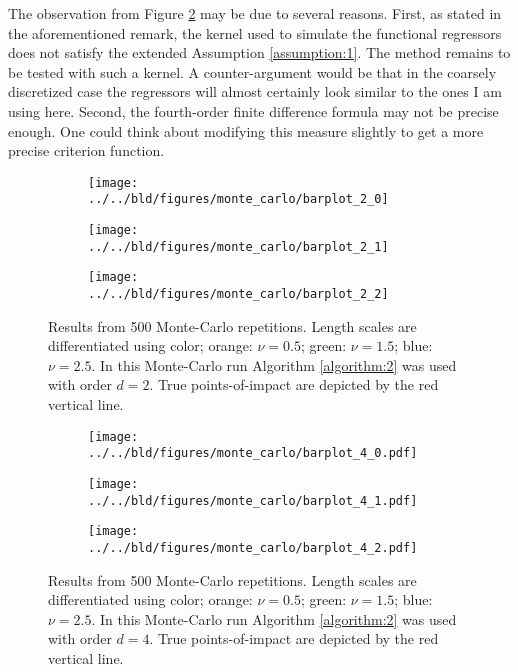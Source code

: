 The observation from Figure \ref{figure:monte_carlo_results_order4} may be due to
several reasons. First, as stated in the aforementioned remark, the kernel used to
simulate the functional regressors does not satisfy the extended Assumption
\ref{assumption:1}. The method remains to be tested with such a kernel. A
counter-argument would be that in the coarsely discretized case the regressors will
almost certainly look similar to the ones I am using here. Second, the fourth-order
finite difference formula may not be precise enough. One could think about modifying
this measure slightly to get a more precise criterion function.

\begin{figure}

\begin{subfigure}[b]{\textwidth}
\centering
\texttt{[image: ../../bld/figures/monte\_carlo/barplot\_2\_0]}
\end{subfigure}

\begin{subfigure}[b]{\textwidth}
\centering
\texttt{[image: ../../bld/figures/monte\_carlo/barplot\_2\_1]}
\end{subfigure}

\begin{subfigure}[b]{\textwidth}
\centering
\texttt{[image: ../../bld/figures/monte\_carlo/barplot\_2\_2]}
\end{subfigure}

\caption{Results from 500 Monte-Carlo repetitions. Length scales are differentiated
using color; orange: $\nu = 0.5$; green: $\nu = 1.5$; blue: $\nu = 2.5$. In this
Monte-Carlo run Algorithm \ref{algorithm:2} was used with order $d = 2$. True
points-of-impact are depicted by the red vertical line.}
\label{figure:monte_carlo_results_order2}
\end{figure}

\begin{figure}

\begin{subfigure}[b]{\textwidth}
\centering
\texttt{[image: ../../bld/figures/monte\_carlo/barplot\_4\_0.pdf]}
\end{subfigure}

\begin{subfigure}[b]{\textwidth}
\centering
\texttt{[image: ../../bld/figures/monte\_carlo/barplot\_4\_1.pdf]}
\end{subfigure}

\begin{subfigure}[b]{\textwidth}
\centering
\texttt{[image: ../../bld/figures/monte\_carlo/barplot\_4\_2.pdf]}
\end{subfigure}

\caption{Results from 500 Monte-Carlo repetitions. Length scales are differentiated
using color; orange: $\nu = 0.5$; green: $\nu = 1.5$; blue: $\nu = 2.5$. In this
Monte-Carlo run Algorithm \ref{algorithm:2} was used with order $d = 4$. True
points-of-impact are depicted by the red vertical line.}
\label{figure:monte_carlo_results_order4}
\end{figure}
